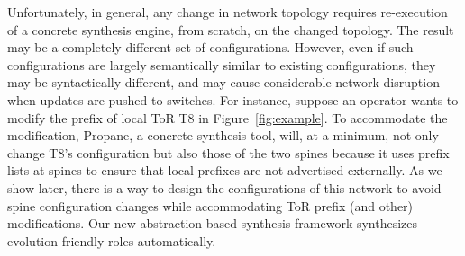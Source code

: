 \documentclass{sig-alternate-10pt}
\begin{document}
Unfortunately, in general, any change in network topology requires re-execution of a
concrete synthesis engine, from scratch,
on the changed topology.  The result may be 
a completely different set of configurations.  However, even if such configurations are
largely semantically similar to existing configurations, they may be syntactically different,
and may cause considerable network disruption when updates are pushed to switches.
For instance, suppose an operator wants to modify the prefix of local ToR T8 in Figure~\ref{fig:example}. To accommodate the modification, Propane, a concrete synthesis tool, will, at a minimum, not only change T8's configuration but also those of the two spines because it uses prefix lists at spines to ensure that local prefixes are not advertised externally.  As we show later, there is a way to design the configurations of this network to avoid spine configuration changes while accommodating ToR prefix (and other) modifications.  Our new 
abstraction-based synthesis framework synthesizes evolution-friendly roles automatically.



\end{document}
